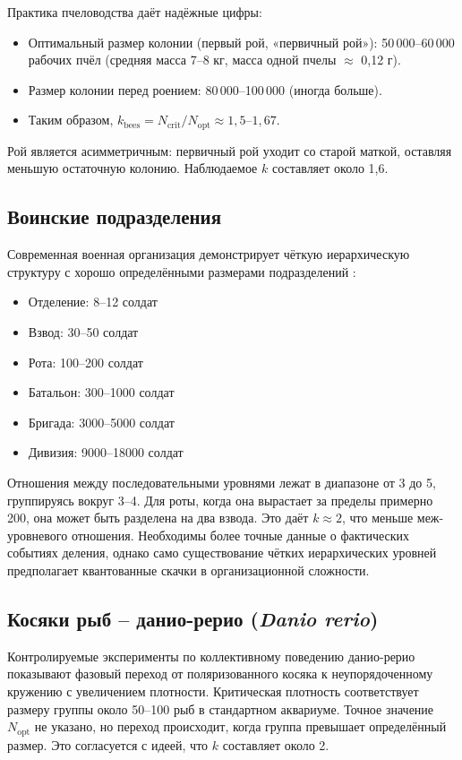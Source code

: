 \documentclass[12pt]{article}
\theoremstyle{remark}
\begin{document}
	Практика пчеловодства даёт надёжные цифры:
	\begin{itemize}
		\item Оптимальный размер колонии (первый рой, «первичный рой»): 50\,000–60\,000 рабочих пчёл (средняя масса 7–8 кг, масса одной пчелы $\approx$ 0,12 г). \cite{Seeley2010, Winston1987}
		\item Размер колонии перед роением: 80\,000–100\,000 (иногда больше). \cite{bees}
		\item Таким образом, $k_{\text{bees}} = N_{\text{crit}}/N_{\text{opt}} \approx 1,5$–$1,67$.
	\end{itemize}
	Рой является асимметричным: первичный рой уходит со старой маткой, оставляя меньшую остаточную колонию. Наблюдаемое $k$ составляет около 1,6.
	
	\subsection{Воинские подразделения}
	\label{subsec:military}
	
	Современная военная организация демонстрирует чёткую иерархическую структуру с хорошо определёнными размерами подразделений \cite{FM3-90.5}:
	\begin{itemize}
		\item Отделение: 8–12 солдат
		\item Взвод: 30–50 солдат
		\item Рота: 100–200 солдат
		\item Батальон: 300–1000 солдат
		\item Бригада: 3000–5000 солдат
		\item Дивизия: 9000–18000 солдат
	\end{itemize}
	Отношения между последовательными уровнями лежат в диапазоне от 3 до 5, группируясь вокруг 3–4. Для роты, когда она вырастает за пределы примерно 200, она может быть разделена на два взвода. Это даёт $k \approx 2$, что меньше меж-уровневого отношения. Необходимы более точные данные о фактических событиях деления, однако само существование чётких иерархических уровней предполагает квантованные скачки в организационной сложности.
	
	\subsection{Косяки рыб – данио-рерио (\textit{Danio rerio})}
	\label{subsec:fish}
	
	Контролируемые эксперименты по коллективному поведению данио-рерио \cite{Tunstrom2013} показывают фазовый переход от поляризованного косяка к неупорядоченному кружению с увеличением плотности. Критическая плотность соответствует размеру группы около 50–100 рыб в стандартном аквариуме. Точное значение $N_{\text{opt}}$ не указано, но переход происходит, когда группа превышает определённый размер. Это согласуется с идеей, что $k$ составляет около 2.
	
\end{document}
